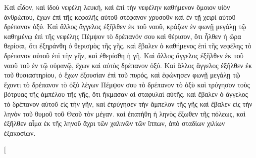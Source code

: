 \begin{pages}
\begin{Rightside}
		\pend
		\pstart
		Καὶ εἶδον, καὶ ἰδοὺ νεφέλη λευκή, καὶ ἐπὶ τὴν νεφέλην καθήμενον ὅμοιον υἱὸν ἀνθρώπου, ἔχων ἐπὶ τῆς κεφαλῆς αὐτοῦ στέφανον χρυσοῦν καὶ ἐν τῇ χειρὶ αὐτοῦ δρέπανον ὀξύ. Καὶ ἄλλος ἄγγελος ἐξῆλθεν ἐκ τοῦ ναοῦ, κράζων ἐν φωνῇ μεγάλῃ τῷ καθημένῳ ἐπὶ τῆς νεφέλης Πέμψον τὸ δρέπανόν σου καὶ θέρισον, ὅτι ἦλθεν ἡ ὥρα θερίσαι, ὅτι ἐξηράνθη ὁ θερισμὸς τῆς γῆς. καὶ ἔβαλεν ὁ καθήμενος ἐπὶ τῆς νεφέλης τὸ δρέπανον αὐτοῦ ἐπὶ τὴν γῆν, καὶ ἐθερίσθη ἡ γῆ. 
		\pend
		\pstart
		Καὶ ἄλλος ἄγγελος ἐξῆλθεν ἐκ τοῦ ναοῦ τοῦ ἐν τῷ οὐρανῷ, ἔχων καὶ αὐτὸς δρέπανον ὀξύ. Καὶ ἄλλος ἄγγελος ἐξῆλθεν ἐκ τοῦ θυσιαστηρίου, ὁ ἔχων ἐξουσίαν ἐπὶ τοῦ πυρός, καὶ ἐφώνησεν φωνῇ μεγάλῃ τῷ ἔχοντι τὸ δρέπανον τὸ ὀξὺ λέγων Πέμψον σου τὸ δρέπανον τὸ ὀξὺ καὶ τρύγησον τοὺς βότρυας τῆς ἀμπέλου τῆς γῆς, ὅτι ἤκμασαν αἱ σταφυλαὶ αὐτῆς.
		\pend 
		\pstart
		καὶ ἔβαλεν ὁ ἄγγελος τὸ δρέπανον αὐτοῦ εἰς τὴν γῆν, καὶ ἐτρύγησεν τὴν ἄμπελον τῆς γῆς καὶ ἔβαλεν εἰς τὴν ληνὸν τοῦ θυμοῦ τοῦ Θεοῦ τὸν μέγαν. καὶ ἐπατήθη ἡ ληνὸς ἔξωθεν τῆς πόλεως, καὶ ἐξῆλθεν αἷμα ἐκ τῆς ληνοῦ ἄχρι τῶν χαλινῶν τῶν ἵππων, ἀπὸ σταδίων χιλίων ἑξακοσίων.
		\pend
        \endnumbering
    \end{Rightside}
    \begin{Leftside}
        \beginnumbering
        \pstart[

\end{Leftside}
\end{pages}

